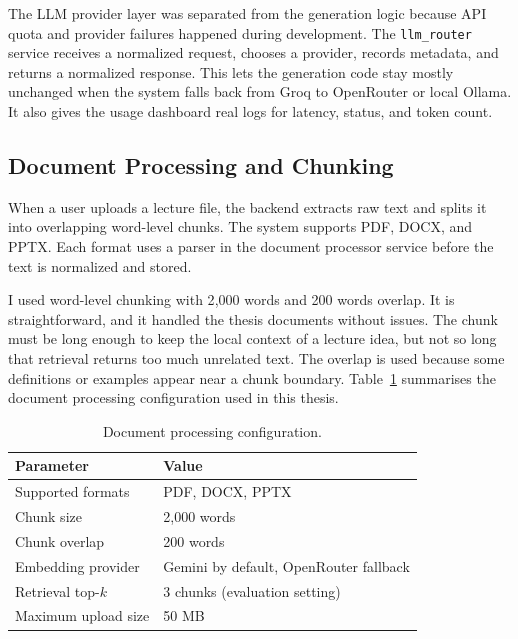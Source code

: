 \documentclass[12pt,a4paper]{article}
\begin{document}
The LLM provider layer was separated from the generation logic because API
quota and provider failures happened during development. The
\texttt{llm\_router} service receives a normalized request, chooses a
provider, records metadata, and returns a normalized response. This lets the
generation code stay mostly unchanged when the system falls back from Groq
to OpenRouter or local Ollama. It also gives the usage dashboard real logs
for latency, status, and token count.

\subsection{Document Processing and Chunking}

When a user uploads a lecture file, the backend extracts raw text and splits
it into overlapping word-level chunks. The system supports PDF, DOCX, and
PPTX. Each format uses a parser in the document processor service before
the text is normalized and stored.

I used word-level chunking with 2{,}000 words and 200 words overlap. It is
straightforward, and it handled the thesis documents without issues. The chunk must
be long enough to keep the local context of a lecture idea, but not so long
that retrieval returns too much unrelated text. The overlap is used because
some definitions or examples appear near a chunk boundary. Table~\ref{tab:chunking}
summarises the document processing configuration used in this thesis.

\begin{table}[H]
  \centering
  \singlespacing
  \caption{Document processing configuration.}
  \label{tab:chunking}
  \small
  \begin{tabular}{@{}p{4.0cm}p{9.4cm}@{}}
    \toprule
    \textbf{Parameter} & \textbf{Value} \\
    \midrule
    Supported formats    & PDF, DOCX, PPTX \\
    Chunk size           & 2{,}000 words \\
    Chunk overlap        & 200 words \\
    Embedding provider   & Gemini by default, OpenRouter fallback \\
    Retrieval top-$k$    & 3 chunks (evaluation setting) \\
    Maximum upload size  & 50 MB \\
    \bottomrule
  \end{tabular}
\end{table}
\end{document}

